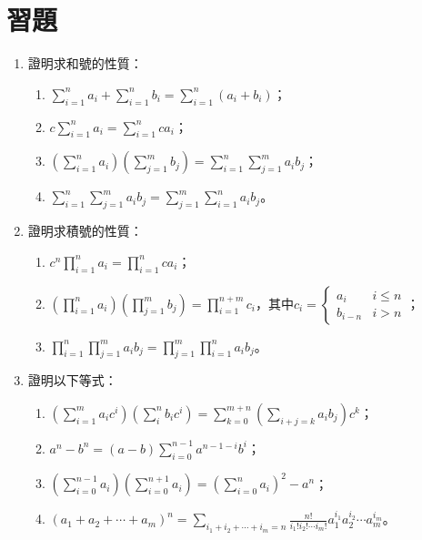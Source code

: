 \documentclass[12pt]{article}
\begin{document}
    \section*{習題}

    \begin{enumerate}
        \item 證明求和號的性質：\begin{enumerate}
            \item $\displaystyle\sum_{i=1}^{n}a_i+\sum_{i=1}^{n}b_i=\sum_{i=1}^{n}(a_i+b_i)$；
            \item $\displaystyle c\sum_{i=1}^{n}a_i=\sum_{i=1}^{n}ca_i$；
            \item $\displaystyle (\sum_{i=1}^{n}a_i)(\sum_{j=1}^{m}b_j)=\sum_{i=1}^{n}\sum_{j=1}^{m}a_ib_j$；
            \item $\displaystyle \sum_{i=1}^{n}\sum_{j=1}^{m}a_ib_j=\sum_{j=1}^{m}\sum_{i=1}^{n}a_ib_j$。
        \end{enumerate}
        \item 證明求積號的性質：\begin{enumerate}
            \item $\displaystyle c^n\prod_{i=1}^{n}a_i=\prod_{i=1}^{n}ca_i$；
            \item $\displaystyle (\prod_{i=1}^{n}a_i)(\prod_{j=1}^{m}b_j)=\prod_{i=1}^{n+m}c_i$，其中$c_i=\begin{cases}
                a_i&i\leq n\\
                b_{i-n}&i>n 
            \end{cases}$；
            \item $\displaystyle \prod_{i=1}^{n}\prod_{j=1}^{m}a_ib_j=\prod_{j=1}^{m}\prod_{i=1}^{n}a_ib_j$。
        \end{enumerate}
        \item 證明以下等式：\begin{enumerate}
            \item $\displaystyle(\sum_{i=1}^{m}a_ic^i)(\sum_{i}^{n}b_ic^i)=\sum_{k=0}^{m+n}(\sum_{i+j=k}a_ib_j)c^k$；
            \item $\displaystyle a^n-b^n=(a-b)\sum_{i=0}^{n-1}a^{n-1-i}b^i$；
            \item $\displaystyle (\sum_{i=0}^{n-1}a_i)(\sum_{i=0}^{n+1}a_i)=(\sum_{i=0}^{n}a_i)^2-a^n$；
            \item $\displaystyle (a_1+a_2+\cdots+a_m)^n=\sum_{i_1+i_2+\cdots+i_m=n}\frac{n!}{i_1!i_2!\cdots i_m!}a_1^{i_1}a_2^{i_2}\cdots a_m^{i_m}$。
        \end{enumerate}

\end{enumerate}
\end{document}
